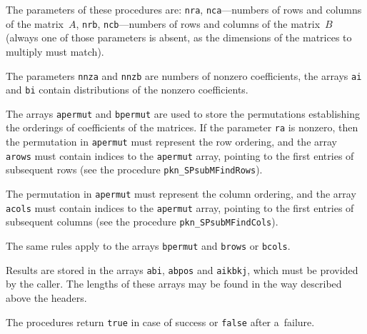 The parameters of these procedures are: \texttt{nra}, \texttt{nca}---numbers
of rows and columns of the matrix~$A$, \texttt{nrb}, \texttt{ncb}---numbers
of rows and columns of the matrix~$B$ (always one of those parameters is
absent, as the dimensions of the matrices to multiply must match).

The parameters \texttt{nnza} and \texttt{nnzb} are numbers of nonzero
coefficients, the arrays \texttt{ai} and \texttt{bi} contain distributions of
the nonzero coefficients.

The arrays \texttt{apermut} and \texttt{bpermut} are used to store the
permutations establishing the orderings of coefficients of the matrices.
If the parameter \texttt{ra} is nonzero, then the permutation in
\texttt{apermut} must represent the row ordering, and the array
\texttt{arows} must contain indices to the \texttt{apermut} array, pointing
to the first entries of subsequent rows (see the procedure
\texttt{pkn\_SPsubMFindRows}).

The permutation in \texttt{apermut} must represent the column ordering,
and the array \texttt{acols} must contain indices to the \texttt{apermut}
array, pointing to the first entries of subsequent columns (see the
procedure \texttt{pkn\_SPsubMFindCols}).

The same rules apply to the arrays \texttt{bpermut} and \texttt{brows} or
\texttt{bcols}.

Results are stored in the arrays \texttt{abi}, \texttt{abpos} and
\texttt{aikbkj}, which must be provided by the caller.
The lengths of these arrays may be found in the way described above the
headers.

The procedures return \texttt{true} in case of success or \texttt{false}
after a~failure.


